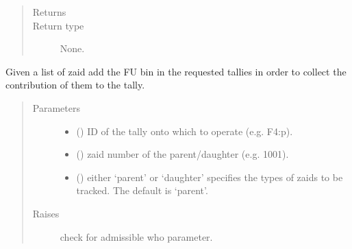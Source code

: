 \documentclass[letterpaper,10pt,english]{sphinxmanual}
\begin{document}
\begin{fulllineitems}
\begin{fulllineitems}
\begin{quote}
\begin{description}
\item[{Returns}] \leavevmode
\sphinxAtStartPar


\item[{Return type}] \leavevmode
\sphinxAtStartPar
None.

\end{description}\end{quote}

\end{fulllineitems}


\begin{fulllineitems}
\label{\detokenize{api/inputgeneration:inputfile.D1S_Input.add_track_contribution}}
\sphinxAtStartPar
Given a list of zaid add the FU bin in the requested tallies in order
to collect the contribution of them to the tally.
\begin{quote}\begin{description}
\item[{Parameters}] \leavevmode\begin{itemize}
\item {} 
\sphinxAtStartPar
{} () \textendash{} ID of the tally onto which to operate (e.g. F4:p).

\item {} 
\sphinxAtStartPar
{} () \textendash{} zaid number of the parent/daughter (e.g. 1001).

\item {} 
\sphinxAtStartPar
{} (\sphinxstyleliteralemphasis{\sphinxupquote{, }}) \textendash{} either ‘parent’ or ‘daughter’ specifies the types of zaids to
be tracked. The default is ‘parent’.

\end{itemize}

\item[{Raises}] \leavevmode
\sphinxAtStartPar
{} \textendash{} check for admissible who parameter.


\end{description}
\end{quote}
\end{fulllineitems}
\end{fulllineitems}
\end{document}
